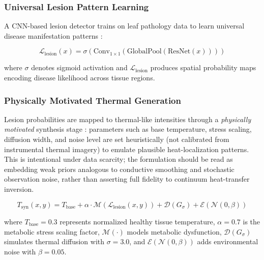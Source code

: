 \documentclass[conference]{IEEEtran}
\begin{document}
\subsubsection{Universal Lesion Pattern Learning}
A CNN-based lesion detector trains on leaf pathology data to learn universal disease manifestation patterns \cite{he2016}:

\begin{equation}
    \mathcal{L}_{\text{lesion}}(x) = \sigma(\text{Conv}_{1\times 1}(\text{GlobalPool}(\text{ResNet}(x))))
    \label{eq:lesion_detector}
\end{equation}

where $\sigma$ denotes sigmoid activation and $\mathcal{L}_{\text{lesion}}$ produces spatial probability maps encoding disease likelihood across tissue regions.

\subsubsection{Physically Motivated Thermal Generation}
Lesion probabilities are mapped to thermal-like intensities through a \emph{physically motivated} synthesis stage \cite{raissi2019}: parameters such as base temperature, stress scaling, diffusion width, and noise level are set heuristically (not calibrated from instrumental thermal imagery) to emulate plausible heat-localization patterns. This is intentional under data scarcity; the formulation should be read as embedding weak priors analogous to conductive smoothing and stochastic observation noise, rather than asserting full fidelity to continuum heat-transfer inversion.

\begin{equation}
    T_{\text{syn}}(x,y) = T_{\text{base}} + \alpha \cdot \mathcal{M}(\mathcal{L}_{\text{lesion}}(x,y)) + \mathcal{D}(G_{\sigma}) + \mathcal{E}(\mathcal{N}(0,\beta))
    \label{eq:thermal_synthesis}
\end{equation}

where $T_{\text{base}} = 0.3$ represents normalized healthy tissue temperature, $\alpha = 0.7$ is the metabolic stress scaling factor, $\mathcal{M}(\cdot)$ models metabolic dysfunction, $\mathcal{D}(G_{\sigma})$ simulates thermal diffusion with $\sigma = 3.0$, and $\mathcal{E}(\mathcal{N}(0,\beta))$ adds environmental noise with $\beta = 0.05$.
\end{document}

